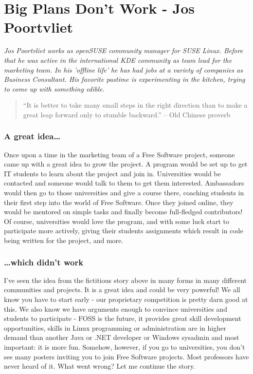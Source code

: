 \chapter{Big Plans Don't Work - Jos Poortvliet}

\textit{Jos Poortvliet works as openSUSE community manager for SUSE Linux. Before that he was active in the international KDE community as team lead for the marketing team. In his 'offline life' he has had jobs at a variety of companies as Business Consultant. His favorite pastime is experimenting in the kitchen, trying to come up with something edible.}

\begin{quote}``It is better to take many small steps in the right direction than to make a great leap forward only to stumble backward.'' -- Old Chinese proverb\end{quote}

\subsection*{A great idea\dots}
Once upon a time in the marketing team of a Free Software project, someone came up with a great idea to grow the project. A program would be set up to get IT students to learn about the project and join in. Universities would be contacted and someone would talk to them to get them interested. Ambassadors would then go to those universities and give a course there, coaching students in their first step into the world of Free Software. Once they joined online, they would be mentored on simple tasks and finally become full-fledged contributors! Of course, universities would love the program, and with some luck start to participate more actively, giving their students assignments which result in code being written for the project, and more.

\subsection*{\dots which didn't work}
I've seen the idea from the fictitious story above in many forms in many different communities and projects. It is a great idea and could be very powerful! We all know you have to start early - our proprietary competition is pretty darn good at this. We also know we have arguments enough to convince universities and students to participate - FOSS is the future, it provides great skill development opportunities, skills in Linux programming or administration are in higher demand than another Java or .NET developer or Windows sysadmin and most important: it is more fun. Somehow, however, if you go to universities, you don't see many posters inviting you to join Free Software projects. Most professors have never heard of it. What went wrong? Let me continue the story.

